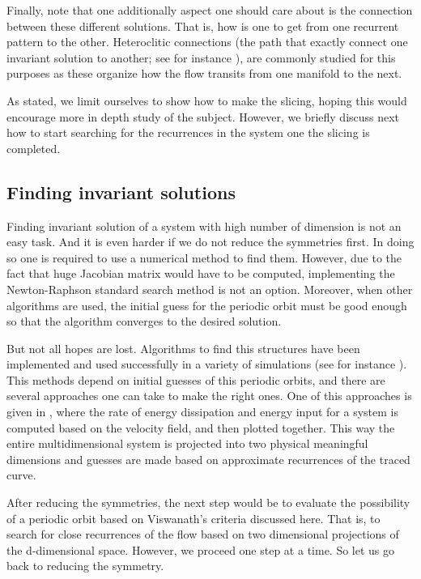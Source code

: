 Finally, note that one additionally aspect  one should care about is the
connection between these different solutions. That is, how is one to get
from one recurrent pattern to the other. Heteroclitic connections (the path that exactly connect one invariant
solution to another; see for instance ), are commonly studied for this purposes as these organize
how the flow transits from one manifold to the next.

As stated, we limit ourselves to show how to make the slicing, hoping this would encourage more in depth study of the subject. However, we briefly discuss next how to start searching for the recurrences in the system one the slicing is completed.

\subsection{Finding invariant solutions}

Finding invariant solution of a system with high number of dimension is not an easy task. And it is even harder if we do not reduce the symmetries first. In doing so one is required to use a numerical method to find them. However, due to the fact that huge Jacobian matrix would have to be computed, implementing the Newton-Raphson standard search method is not an option. Moreover, when other algorithms are used, the initial guess for the periodic orbit must be good enough so that the algorithm converges to the desired solution.

But not all hopes are lost. Algorithms to find this structures have been implemented and used successfully in a variety of simulations (see for instance ). This methods depend on initial guesses of this periodic orbits, and there are several approaches one can take to make the right ones. One of this approaches is given in , where the rate of energy dissipation and energy input for a system is computed based on the velocity field, and then plotted together. This way the entire multidimensional system is projected into two physical meaningful dimensions and guesses are made based on approximate recurrences of the traced curve.  

After reducing the symmetries, the next step would be to evaluate the possibility of a periodic orbit based on Viswanath's criteria discussed here. That is, to search for close recurrences of the flow based on two dimensional projections of the d-dimensional space. However, we proceed one step at a time. So let us go back to reducing the symmetry.


